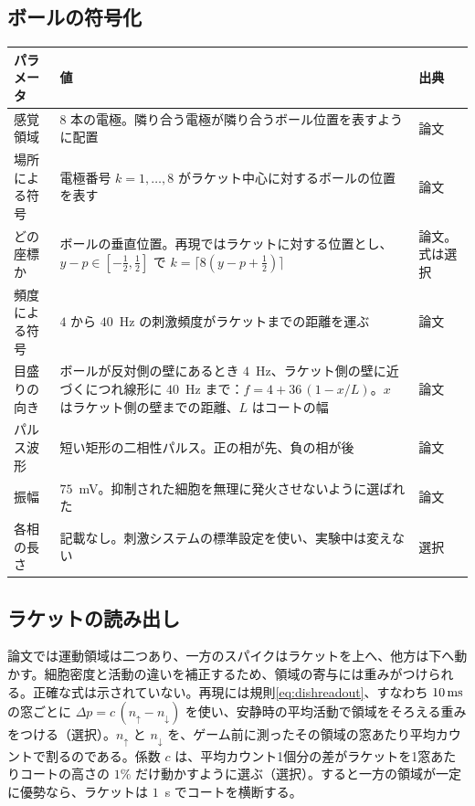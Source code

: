 \subsection*{ボールの符号化}

\begin{center}
\footnotesize
\setlength{\tabcolsep}{4pt}
\renewcommand{\arraystretch}{1.15}
\begin{tabular}{>{\raggedright}p{3.4cm}>{\raggedright}p{7.5cm}>{\raggedright\arraybackslash}p{1.6cm}}
\toprule
パラメータ & 値 & 出典 \\
\midrule
感覚領域 & $8$ 本の電極。隣り合う電極が隣り合うボール位置を表すように配置 & 論文 \\
場所による符号 & 電極番号 $k=1,\dots,8$ がラケット中心に対するボールの位置を表す & 論文 \\
どの座標か & ボールの垂直位置。再現ではラケットに対する位置とし、$y-p\in[-\tfrac12,\tfrac12]$ で $k=\lceil 8(y-p+\tfrac12)\rceil$ & 論文。式は選択 \\
頻度による符号 & $4$ から $40$~Hz の刺激頻度がラケットまでの距離を運ぶ & 論文 \\
目盛りの向き & ボールが反対側の壁にあるとき $4$~Hz、ラケット側の壁に近づくにつれ線形に $40$~Hz まで：$f=4+36\,(1-x/L)$。$x$ はラケット側の壁までの距離、$L$ はコートの幅 & 論文 \\
パルス波形 & 短い矩形の二相性パルス。正の相が先、負の相が後 & 論文 \\
振幅 & $75$~mV。抑制された細胞を無理に発火させないように選ばれた & 論文 \\
各相の長さ & 記載なし。刺激システムの標準設定を使い、実験中は変えない & 選択 \\
\bottomrule
\end{tabular}
\end{center}

\subsection*{ラケットの読み出し}

論文では運動領域は二つあり、一方のスパイクはラケットを上へ、他方は下へ動かす。細胞密度と活動の違いを補正するため、領域の寄与には重みがつけられる\cite{Kagan2022}。正確な式は示されていない。再現には規則\eqref{eq:dishreadout}、すなわち $10\,\text{ms}$ の窓ごとに $\Delta p=c\,(n_\uparrow-n_\downarrow)$ を使い、安静時の平均活動で領域をそろえる重みをつける（選択）。$n_\uparrow$ と $n_\downarrow$ を、ゲーム前に測ったその領域の窓あたり平均カウントで割るのである。係数 $c$ は、平均カウント1個分の差がラケットを1窓あたりコートの高さの $1\%$ だけ動かすように選ぶ（選択）。すると一方の領域が一定に優勢なら、ラケットは $1$~s でコートを横断する。

